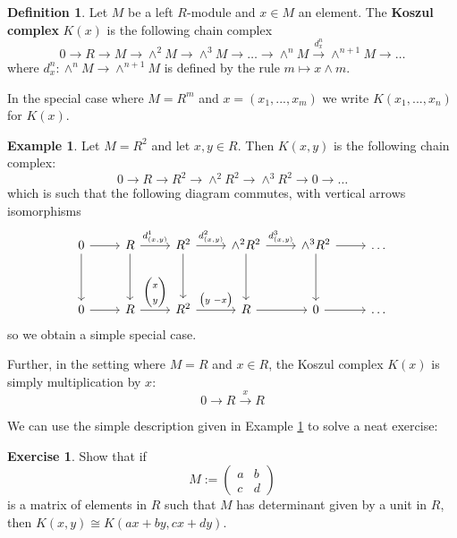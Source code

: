\documentclass[12pt]{article}
\theoremstyle{plain}
\theoremstyle{definition}
\newtheorem{defn}[thm]{Definition} %
\newtheorem{exercise}[thm]{Exercise}
\newtheorem{example}[thm]{Example}
\newcommand{\lto}{\longrightarrow}
\begin{document}
%
\begin{defn}
Let $M$ be a left $R$-module and $x \in M$ an element. The \textbf{Koszul complex} $K(x)$ is the following chain complex
\begin{equation}
0 \lto R \lto M \lto \wedge^2 M \lto \wedge^3 M \lto \hdots \lto \wedge^n M \stackrel{d_x^n}{\lto} \wedge^{n+1}M \lto \hdots
\end{equation}
where $d_x^n: \wedge^n M \lto \wedge^{n+1}M$ is defined by the rule $m \longmapsto x \wedge m$.

In the special case where $M = R^m$ and $x = (x_1,...,x_m)$ we write $K(x_1,...,x_n)$ for $K(x)$.
\end{defn}
\begin{example}\label{ex:K(x,y)}
Let $M = R^2$ and let $x,y \in R$. Then $K(x,y)$ is the following chain complex:
\begin{equation}
0 \lto R \lto R^2 \lto \wedge^2 R^2 \lto \wedge^3 R^2 \lto 0 \lto \hdots
\end{equation}
which is such that the following diagram commutes, with vertical arrows isomorphisms
\begin{equation}
\begin{tikzcd}[row sep = huge]
0\arrow[r]\arrow[d] & R\arrow[r,"{d_{(x,y)}^1}"]\arrow[d] & R^2\arrow[r,"{d_{(x,y)}^2}"]\arrow[d] &\wedge^2 R^2\arrow[r,"{d_{(x,y)}^3}"]\arrow[d] & \wedge^3 R^2\arrow[d]\arrow[r] &  \hdots\\
0\arrow[r] & R\arrow[r,"{\begin{pmatrix}
x\\
y
\end{pmatrix}
}"] & R^2\arrow[r,"{\begin{pmatrix}
y \text{  } -x
\end{pmatrix}
}"]  & R\arrow[r] & 0\arrow[r] & \hdots
\end{tikzcd}
\end{equation}
so we obtain a simple special case.

Further, in the setting where $M = R$ and $x \in R$, the Koszul complex $K(x)$ is simply multiplication by $x$:
\begin{equation}
0 \lto R \stackrel{x}{\lto} R
\end{equation}
\end{example}
We can use the simple description given in Example \ref{ex:K(x,y)} to solve a neat exercise:
\begin{exercise}
Show that if
\begin{equation}
M := \begin{pmatrix}
a & b\\
c & d
\end{pmatrix}
\end{equation}
is a matrix of elements in $R$ such that $M$ has determinant given by a unit in $R$, then $K(x,y) \cong K(ax + by, cx + dy)$.
\end{exercise}
\end{document}
